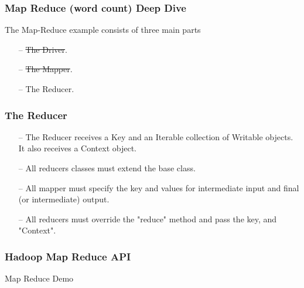\begin{frame}[c]{ }
	\frametitle{Map Reduce (word count) Deep Dive }
	
	The Map-Reduce example consists of three main parts
	
	\begin{itemize}  [<+->]
		\item [--] \sout{The Driver}.
		\item [--] \sout{The Mapper}.
		\item [--] The Reducer.
		
	\end{itemize}
\end{frame}
\begin{frame}[c]{ }
	\frametitle{The Reducer}
	
	\begin{itemize}  [<+->]
		
		\item [--] The Reducer receives a Key and an Iterable collection of Writable objects. It also receives a Context object.
		
		\item [--] All reducers classes must extend the   base class.
		
		\item [--] All mapper must specify the key and values for intermediate input and final (or intermediate) output.		
		
		\item [--] All reducers must override the "reduce" method and pass the key,  and "Context".

	\end{itemize}
	
\end{frame}
\begin{frame}[c]{ }
	\frametitle{ Hadoop Map Reduce API}
	\centering     
	
	\textcolor{offgreen}{ \large Map Reduce Demo}
\end{frame}
